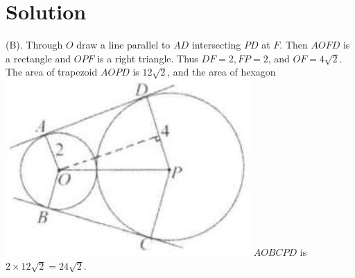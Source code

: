 \documentclass{article}
\begin{document}
\section*{Solution}
(B).
Through \(O\) draw a line parallel to \(A D\) intersecting \(P D\) at \(F\). Then \(A O F D\) is a rectangle and \(O P F\) is a right triangle. Thus \(D F=2, F P=2\), and \(O F=4 \sqrt{2}\). The area of trapezoid \(A O P D\) is \(12 \sqrt{2}\), and the area of hexagon\\
\includegraphics[width=\textwidth]{images/reasoning_image_1.jpg} \(A O B C P D\) is \(2 \times 12 \sqrt{2}=24 \sqrt{2}\).
\end{document}
